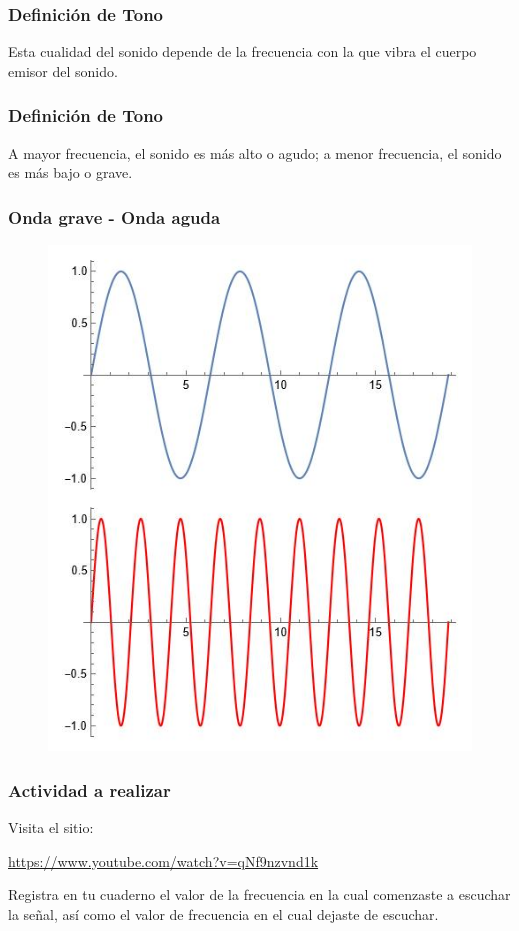 \documentclass[14pt]{beamer}
\begin{document}
\begin{frame}
\frametitle{Definición de Tono}
Esta cualidad del sonido depende de la frecuencia con la que vibra el cuerpo emisor del sonido. 
\end{frame}
\begin{frame}
\frametitle{Definición de Tono}
A mayor frecuencia, el sonido es más alto o agudo; \pause a menor frecuencia, el sonido es más bajo o grave.
\end{frame}
\begin{frame}
\frametitle{Onda grave - Onda aguda}
\begin{figure}
    \includegraphics[scale=0.4]{Imagenes/Tono_01.jpg}
\end{figure}
\end{frame}
\begin{frame}
\frametitle{Actividad a realizar}
Visita el sitio:

\href{https://www.youtube.com/watch?v=qNf9nzvnd1k}{https://www.youtube.com/watch?v=qNf9nzvnd1k}

Registra en tu cuaderno el valor de la frecuencia en la cual comenzaste a escuchar la señal, así como el valor de frecuencia en el cual dejaste de escuchar.
\end{frame}
\end{document}
